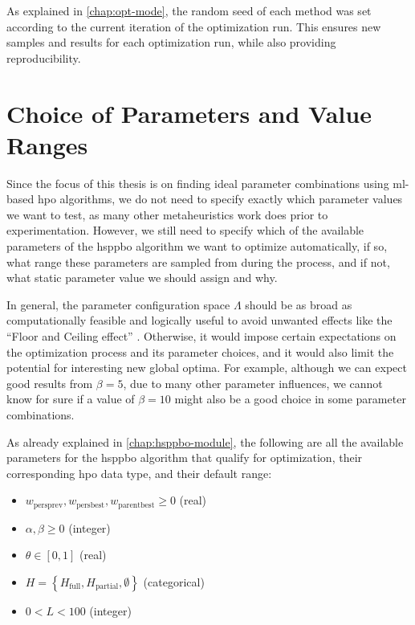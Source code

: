 As explained in \cref{chap:opt-mode}, the random seed of each method was set according to the current iteration of the optimization run. This ensures new samples and results for each optimization run, while also providing reproducibility.

\section{Choice of Parameters and Value Ranges}

Since the focus of this thesis is on finding ideal parameter combinations using \gls{ml}-based \glsdesc{hpo} algorithms, we do not need to specify exactly which parameter values we want to test, as many other metaheuristics work does prior to experimentation. However, we still need to specify which of the available parameters of the \gls{hsppbo} algorithm we want to optimize automatically, if so, what range these parameters are sampled from during the process, and if not, what static parameter value we should assign and why.

In general, the parameter configuration space $\Lambda$ should be as broad as computationally feasible and logically useful to avoid unwanted effects like the \enquote{Floor and Ceiling effect} \cite[p.~47]{vogt2011dictionary}. Otherwise, it would impose certain expectations on the optimization process and its parameter choices, and it would also limit the potential for interesting new global optima. For example, although we can expect good results from $\beta = 5$, due to many other parameter influences, we cannot know for sure if a value of $\beta = 10$ might also be a good choice in some parameter combinations.

As already explained in \cref{chap:hsppbo-module}, the following are all the available parameters for the \gls{hsppbo} algorithm that qualify for optimization, their corresponding \gls{hpo} data type, and their default range:
\begin{itemize}
	\item $w_{\text{persprev}}, w_{\text{persbest}}, w_{\text{parentbest}} \geq 0$ (real)
	\item $\alpha, \beta \geq 0$ (integer)
	\item $\theta \in [0,1]$ (real)
	\item $H = \left\lbrace H_{\text{full}}, H_{\text{partial}}, \emptyset \right\rbrace$ (categorical)
	\item $0 < L < 100$ (integer)
\end{itemize}


